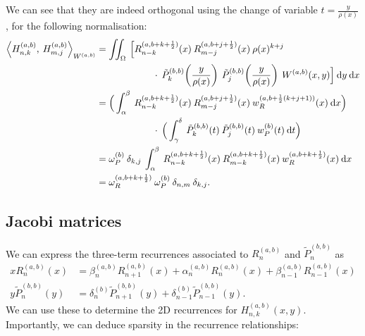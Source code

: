 \documentclass[11pt, oneside]{article}   	%
\newcommand{\half}{\frac{1}{2}}
\newcommand{\R}{\mathbb{R}}
\newcommand{\hdop}{H}
\newcommand{\hdopnkab}{\hdop_{n,k}^{(a,b)}}
\newcommand{\Wab}{{W^{(a,b)}}}
\newcommand{\hdopmjab}{\hdop_{m,j}^{(a,b)}}
\newcommand{\jac}{{\tilde P}}
\newcommand{\genjac}{R}
\newcommand{\genjacnmk}{\genjac_{n-k}}
\newcommand{\genjacmmj}{\genjac_{m-j}}
\newcommand{\genjacw}{w_\genjac}
\newcommand{\jacw}{w_P}
\newcommand{\normgenjac}{\omega_\genjac}
\newcommand{\normjac}{\omega_P}
\begin{document}
We can see that they are indeed orthogonal using the change of variable $t = \frac{y}{\rho(x)}$, for the following normalisation:
\begin{align}
	\ip< \hdopnkab, \: \hdopmjab >_\Wab &=  \iint_\Omega \: \Big[ \genjacnmk^{(a,b+k+\half)}(x) \: \genjacmmj^{(a,b+j+\half)}(x) \: \rho(x)^{k+j}  \nonumber \\
		&\quad \quad \quad \quad \quad \quad \cdot \: \jac_k^{(b,b)}\fpr(\frac{y}{\rho(x)}) \: \jac_j^{(b,b)}\fpr(\frac{y}{\rho(x)})  \: \Wab(x,y) \Big] \: \D y \: \D x \nonumber \\
	&= \Big( \int_\alpha^\beta \: {\genjacnmk^{(a,b+k+\half)}}(x) \: {\genjacmmj^{(a,b+j+\half)}}(x) \: \genjacw^{(a,b+\half(k+j+1))}(x) \: \D x \Big) \nonumber \\
	&\quad \quad \quad \quad \quad \quad \cdot \: \Big( \int_\gamma^\delta \: {\jac_k^{(b,b)}}(t) \:  {\jac_j^{(b,b)}}(t) \: \jacw^{(b)}(t) \: \D t \Big) \nonumber \\
	&= \normjac^{(b)} \: \delta_{k,j} \: \int_\alpha^\beta \: {\genjacnmk^{(a,b+k+\half)}}(x) \: {\genjac_{m-k}^{(a,b+k+\half)}}(x) \: \genjacw^{(a,b+k+\half)}(x) \: \D x \nonumber \\ 
	&= \normgenjac^{(a,b+k+\half)} \: \normjac^{(b)} \: \delta_{n,m} \: \delta_{k,j}. \label{eqn:normhdop}
\end{align}


\subsection{Jacobi matrices}

We can express the three-term recurrences associated to $\genjac_n^{(a,b)}$ and $\jac_n^{(b,b)}$ as 
\begin{align}
	x \genjac_n^{(a,b)}(x) &= \beta_n^{(a,b)} \genjac_{n+1}^{(a,b)}(x) + \alpha_n^{(a,b)} \genjac_n^{(a,b)}(x) + \beta_{n-1}^{(a,b)} \genjac_{n-1}^{(a,b)}(x) \label{eqn:Hrecurrence} \\
	y \jac_n^{(b,b)}(y) &= \delta_n^{(b)} \jac_{n+1}^{(b,b)}(y) + \delta_{n-1}^{(b)} \jac_{n-1}^{(b,b)}(y).
\end{align}
 We can use these to determine the 2D recurrences for $\hdopnkab(x,y)$. Importantly, we can deduce sparsity in the recurrence relationships:
\end{document}
